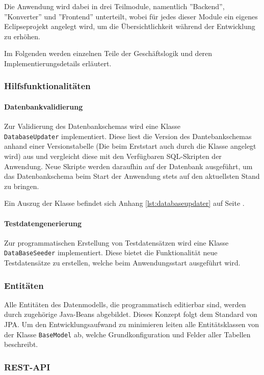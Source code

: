 \documentclass[12pt, xcolor=dvipsnames]{scrartcl}
\begin{document}
Die Anwendung wird dabei in drei Teilmodule, namentlich ''Backend'', ''Konverter'' und ''Frontend'' unterteilt, wobei für jedes dieser Module ein eigenes Eclipseprojekt angelegt wird, um die Übersichtlichkeit während der Entwicklung zu erhöhen.

Im Folgenden werden einzelnen Teile der Geschäftslogik und deren Implementierungsdetails erläutert.

\subsubsection*{Hilfsfunktionalitäten}

\paragraph*{Datenbankvalidierung}
Zur Validierung des Datenbankschemas wird eine Klasse \\\texttt{DatabaseUpdater} implementiert. Diese liest die Version des Dantebankschemas anhand einer Versionstabelle (Die beim Erststart auch durch die Klasse angelegt wird) aus und vergleicht diese mit den Verfügbaren SQL-Skripten der Anwendung. Neue Skripte werden daraufhin auf der Datenbank ausgeführt, um das Datenbankschema beim Start der Anwendung stets auf den aktuellsten Stand zu bringen.

Ein Auszug der Klasse befindet sich Anhang \ref{lst:databaseupdater} auf Seite \pageref{lst:databaseupdater}.

\paragraph*{Testdatengenerierung}
Zur programmatischen Erstellung von Testdatensätzen wird eine Klasse \texttt{DataBaseSeeder} implementiert. Diese bietet die Funktionalität neue Testdatensätze zu erstellen, welche beim Anwendungsstart ausgeführt wird.

\subsubsection*{Entitäten}

Alle Entitäten des Datenmodells, die programmatisch editierbar sind, werden durch zugehörige Java-Beans abgebildet. Dieses Konzept folgt dem Standard von JPA. Um den Entwicklungsaufwand zu minimieren leiten alle Entitätsklassen von der Klasse \texttt{BaseModel} ab, welche Grundkonfiguration und Felder aller Tabellen beschreibt.

\subsubsection*{REST-API}
\end{document}
